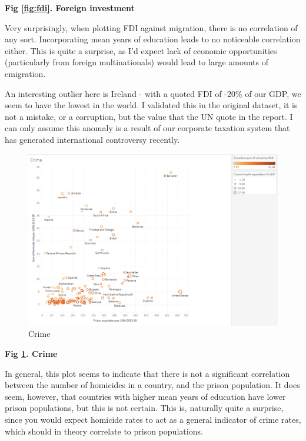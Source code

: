 \documentclass[ 10pt ]{fphw}
\begin{document}
\textbf{Fig \ref{fig:fdi}. Foreign investment} 

\vspace{0.25cm}

Very surprisingly, when plotting FDI against migration, there is no correlation of any sort.  Incorporating mean years of education leads to no noticeable correlation either. This is quite a surprise, as I'd expect lack of economic opportunities (particularly from foreign multinationals) would lead to large amounts of emigration.

An interesting outlier here is Ireland - with a quoted FDI of -20\% of our GDP, we seem to have the lowest in the world. I validated this in the original dataset, it is not a mistake, or a corruption, but the value that the UN quote in the report. I can only assume this anomaly is a result of our corporate taxation system that has generated international controversy recently. 

\begin{center}
\begin{figure}[H]
    \centering
    \includegraphics[width=0.75\columnwidth]{crime.PNG} 
	\caption{Crime}
	\label{fig:crime}
	\end{figure}
\end{center}

\textbf{Fig \ref{fig:crime}. Crime} 

\vspace{0.25cm}

In general, this plot seems to indicate that there is not a significant correlation between the number of homicides in a country, and the prison population. It does seem, however, that countries with higher mean years of education have lower prison populations, but this is not certain. This is, naturally quite a surprise, since you would expect homicide rates to act as a general indicator of crime rates, which should in theory correlate to prison populations.
\end{document}
